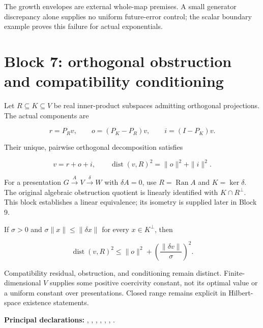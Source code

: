 \documentclass[11pt]{article}
\begin{document}
The growth envelopes are external whole-map premises. A small generator
discrepancy alone supplies no uniform future-error control; the scalar
boundary example proves this failure for actual exponentials.

\hypertarget{block-7-orthogonal-obstruction-and-compatibility-conditioning}{%
\section{Block 7: orthogonal obstruction and compatibility
conditioning}\label{block-7-orthogonal-obstruction-and-compatibility-conditioning}}

Let \(R\subseteq K\subseteq V\) be real inner-product subspaces
admitting orthogonal projections. The actual components are

\[
r=P_Rv,\qquad o=(P_K-P_R)v,\qquad i=(I-P_K)v.
\]

Their unique, pairwise orthogonal decomposition satisfies

\[
v=r+o+i,\qquad \operatorname{dist}(v,R)^2=\|o\|^2+\|i\|^2.
\]

For a presentation \(G\xrightarrow{A}V\xrightarrow{\delta}W\) with
\(\delta A=0\), use \(R=\operatorname{Ran}A\) and \(K=\ker\delta\). The
original algebraic obstruction quotient is linearly identified with
\(K\cap R^\perp\). This block establishes a linear equivalence; its
isometry is supplied later in Block 9.

If \(\sigma>0\) and \(\sigma\|x\|\le\|\delta x\|\) for every
\(x\in K^\perp\), then

\[
\operatorname{dist}(v,R)^2\le\|o\|^2+
\left(\frac{\|\delta v\|}{\sigma}\right)^2.
\]

Compatibility residual, obstruction, and conditioning remain distinct.
Finite-dimensional \(V\) supplies some positive coercivity constant, not
its optimal value or a uniform constant over presentations. Closed range
remains explicit in Hilbert-space existence statements.

\textbf{Principal declarations:}
\texttt{},
\texttt{},
\texttt{},
\texttt{},
\texttt{},
\texttt{},
\texttt{}.
\end{document}
